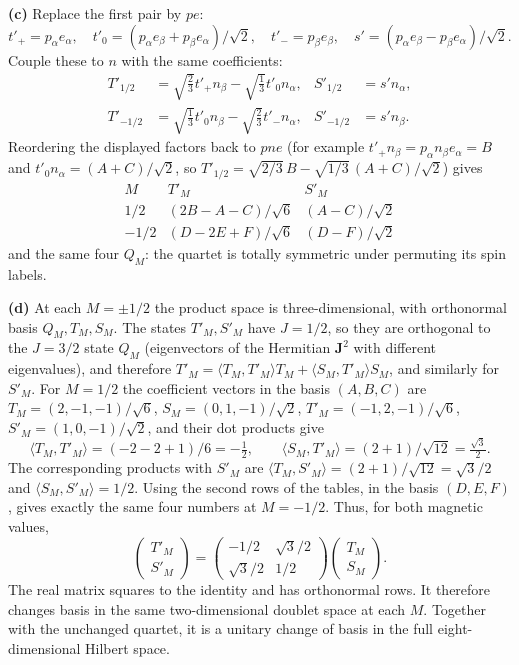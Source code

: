 \textbf{(c)} Replace the first pair by $pe$:
\[
t'_+=p_\alpha e_\alpha,\quad
t'_0=(p_\alpha e_\beta+p_\beta e_\alpha)/\sqrt2,\quad
t'_-=p_\beta e_\beta,\quad
s'=(p_\alpha e_\beta-p_\beta e_\alpha)/\sqrt2.
\]
Couple these to $n$ with the same coefficients:
\[
\begin{aligned}
T'_{1/2}&=\sqrt{\tfrac23}t'_+n_\beta-\sqrt{\tfrac13}t'_0n_\alpha,&
S'_{1/2}&=s'n_\alpha,\\
T'_{-1/2}&=\sqrt{\tfrac13}t'_0n_\beta-\sqrt{\tfrac23}t'_-n_\alpha,&
S'_{-1/2}&=s'n_\beta.
\end{aligned}
\]
Reordering the displayed factors back to $pne$ (for example
$t'_+n_\beta=p_\alpha n_\beta e_\alpha=B$ and
$t'_0n_\alpha=(A+C)/\sqrt2$, so
$T'_{1/2}=\sqrt{2/3}\,B-\sqrt{1/3}\,(A+C)/\sqrt2$) gives
\[
\begin{array}{c|cc}
M&T'_M&S'_M\\ \hline
1/2&(2B-A-C)/\sqrt6&(A-C)/\sqrt2\\
-1/2&(D-2E+F)/\sqrt6&(D-F)/\sqrt2
\end{array}
\]
and the same four $Q_M$: the quartet is totally symmetric under
permuting its spin labels.

\textbf{(d)} At each $M=\pm1/2$ the product space is
three-dimensional, with orthonormal basis $Q_M,T_M,S_M$. The states
$T'_M,S'_M$ have $J=1/2$, so they are orthogonal to the $J=3/2$
state $Q_M$ (eigenvectors of the Hermitian $\mathbf J^2$ with different
eigenvalues), and therefore
$T'_M=\langle T_M,T'_M\rangle T_M+\langle S_M,T'_M\rangle S_M$, and
similarly for $S'_M$. For $M=1/2$ the coefficient vectors in the
basis $(A,B,C)$ are $T_M=(2,-1,-1)/\sqrt6$, $S_M=(0,1,-1)/\sqrt2$,
$T'_M=(-1,2,-1)/\sqrt6$, $S'_M=(1,0,-1)/\sqrt2$, and their dot
products give
\[
\langle T_M,T'_M\rangle=(-2-2+1)/6=-\tfrac12,\qquad
\langle S_M,T'_M\rangle=(2+1)/\sqrt{12}=\tfrac{\sqrt3}{2}.
\]
The corresponding products with $S'_M$ are
$\langle T_M,S'_M\rangle=(2+1)/\sqrt{12}=\sqrt3/2$ and
$\langle S_M,S'_M\rangle=1/2$.
Using the second rows of the tables, in the basis $(D,E,F)$, gives
exactly the same four numbers at $M=-1/2$. Thus, for both magnetic
values,
\[
\boxed{\begin{pmatrix}T'_M\\S'_M\end{pmatrix}
=\begin{pmatrix}-1/2&\sqrt3/2\\ \sqrt3/2&1/2\end{pmatrix}
\begin{pmatrix}T_M\\S_M\end{pmatrix}}.
\]
The real matrix squares to the identity and has orthonormal rows.
It therefore changes basis in the same two-dimensional doublet space
at each $M$. Together with the unchanged quartet, it is a unitary
change of basis in the full eight-dimensional Hilbert space.

